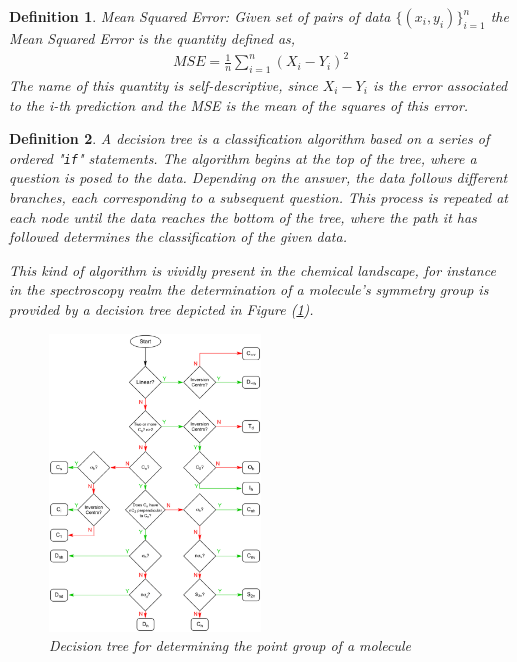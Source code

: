 \documentclass[11pt]{article}
\newtheorem{definition}{Definition}
\begin{document}
\begin{definition}\label{definitionMeanSquaredError}
Mean Squared Error: Given set of pairs of data $\{(x_i,y_i)\}_{i=1}^n$ the Mean Squared Error is the quantity defined as,
\begin{align}
	MSE=\frac{1}{n}\sum_{i=1}^n(X_i-Y_i)^2
\end{align}
The name of this quantity is self-descriptive, since $X_i-Y_i$ is the error associated to the i-th prediction and the MSE is the mean of the squares of this error.
\end{definition}

\begin{definition}\label{definitionDecisionTree}
A decision tree is a classification algorithm based on a series of ordered "\texttt{if}" statements. The algorithm begins at the top of the tree, where a question is posed to the data. Depending on the answer, the data follows different branches, each corresponding to a subsequent question. This process is repeated at each node until the data reaches the bottom of the tree, where the path it has followed determines the classification of the given data.

This kind of algorithm is vividly present in the chemical landscape, for instance in the spectroscopy realm the determination of a molecule's symmetry group is provided by a decision tree depicted in Figure (\ref{figExScpectroDecisionTree}).
\begin{figure}[H]
\centering
\includegraphics[width = 0.5\textwidth]{GeneralSources/Point_group_determination_flowchart_v2.png}
\caption{Decision tree for determining the point group of a molecule}
\label{figExScpectroDecisionTree}
\end{figure}
\end{definition}
\end{document}
